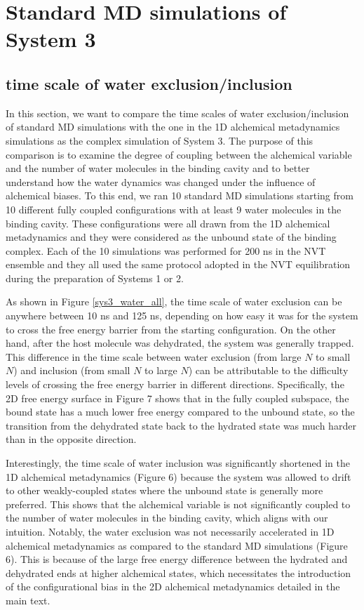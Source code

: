 \documentclass[journal=jacsat,manuscript=article]{achemso}
\begin{document}
\section{Standard MD simulations of System 3}
\subsection{time scale of water exclusion/inclusion}
In this section, we want to compare the time scales of water exclusion/inclusion of standard MD simulations with the one in the 1D alchemical metadynamics simulations as the complex simulation of System 3. The purpose of this comparison is to examine the degree of coupling between the alchemical variable and the number of water molecules in the binding cavity and to better understand how the water dynamics was changed under the influence of alchemical biases. To this end, we ran 10 standard MD simulations starting from 10 different fully coupled configurations with at least 9 water molecules in the binding cavity. These configurations were all drawn from the 1D alchemical metadynamics and they were considered as the unbound state of the binding complex. Each of the 10 simulations was performed for 200 ns in the NVT ensemble and they all used the same protocol adopted in the NVT equilibration during the preparation of Systems 1 or 2. 

As shown in Figure \ref{sys3_water_all}, the time scale of water exclusion can be anywhere between 10 ns and 125 ns, depending on how easy it was for the system to cross the free energy barrier from the starting configuration. On the other hand, after the host molecule was dehydrated, the system was generally trapped. This difference in the time scale between water exclusion (from large $N$ to small $N$) and inclusion (from small $N$ to large $N$) can be attributable to the difficulty levels of crossing the free energy barrier in different directions. Specifically, the 2D free energy surface in Figure 7 shows that in the fully coupled subspace, the bound state has a much lower free energy compared to the unbound state, so the transition from the dehydrated state back to the hydrated state was much harder than in the opposite direction. 

Interestingly, the time scale of water inclusion was significantly shortened in the 1D alchemical metadynamics (Figure 6) because the system was allowed to drift to other weakly-coupled states where the unbound state is generally more preferred. This shows that the alchemical variable is not significantly coupled to the number of water molecules in the binding cavity, which aligns with our intuition. Notably, the water exclusion was not necessarily accelerated in 1D alchemical metadynamics as compared to the standard MD simulations (Figure 6). This is because of the large free energy difference between the hydrated and dehydrated ends at higher alchemical states, which necessitates the introduction of the configurational bias in the 2D alchemical metadynamics detailed in the main text.
\end{document}
